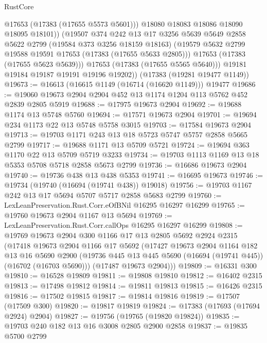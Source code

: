 \begin{lexlean}{RustCore}
\begin{coremodule}
                @17653
                (@17383 (@17655 @5573 @5601)))
              @18080
              @18083
              @18086
              @18090
              @18095
              @18101))
          (@19507
            @374
            @242
            @13
            @17
            @3256
            @5639
            @5649
            @2858
            @5622
            @2799
            (@19584 @373 @3256 @18159 @18163)
            (@19579 @5632 @2799 @19588 @19591 @17653 (@17383 (@17655 @5633 @2805)))
            @17653
            (@17383 (@17655 @5623 @5639)))
          @17653
          (@17383 (@17655 @5565 @5640)))
        @19181
        @19184
        @19187
        @19191
        @19196
        @19202))
    (@17383 (@19281 @19477 @1149))
@19673 := @16613 (@16615 @1149 (@16714 (@16620 @1149))) @19477
@19686 := @19060 @19673 @2904 @2904 @452 @13 @1174 @1204 @113 @5762 @452 @2839 @2805 @5919
@19688 := @17975 @19673 @2904
@19692 := @19688 @1174 @13 @5748 @5760
@19694 := @17571 @19673 @2904
@19701 := @19694 @234 @1173 @22 @13 @5748 @5758 @3015
@19703 := @17584 @19673 @2904
@19713 := @19703 @1171 @243 @13 @18 @5723 @5747 @5757 @2858 @5665 @2799
@19717 := @19688 @1171 @13 @5709 @5721
@19724 := @19694 @363 @1170 @22 @13 @5709 @5719 @3233
@19734 := @19703 @1113 @1169 @13 @18 @5353 @5708 @5718 @2858 @5673 @2799
@19736 := @16686 @19673 @2904
@19740 := @19736 @438 @13 @438 @5353
@19741 := @16695 @19673
@19746 := @19734 (@19740 (@16694 (@19741 @438)) @19018)
@19756 := @19703 @1167 @242 @13 @17 @5694 @5707 @5717 @2858 @5683 @2799
@19760 := LexLeanPreservation.Rust.Corr.eOfBNil @16295 @16297 @16299
@19765 := @19760 @19673 @2904 @1167 @13 @5694
@19769 := LexLeanPreservation.Rust.Corr.callOps @16295 @16297 @16299
@19808 := @19769
    @19673
    @2904
    @300
    @1166
    @17
    @13
    @2805
    @5692
    @2924
    @2315
    (@17418
      @19673
      @2904
      @1166
      @17
      @5692
      (@17427
        @19673
        @2904
        @1164
        @182
        @13
        @16
        @5690
        @2900
        (@19736 @445 @13 @445 @5690 (@16694 (@19741 @445)) (@16702 (@16703 @5690)))
        (@17487 @19673 @2904)))
@19809 := @16331 @300
@19810 := @16528 @19809
@19811 := @19808 @19810
@19812 := @16402 @2315
@19813 := @17498 @19812
@19814 := @19811 @19813
@19815 := @16426 @2315
@19816 := @17502 @19815
@19817 := @19814 @19816
@19819 := @17507 (@17509 @300)
@19820 := @19817 @19819
@19824 := @17383 (@17693 (@17694 @2924) @2904)
@19827 := @19756 (@19765 (@19820 @19824))
@19835 := @19703 @240 @182 @13 @16 @3008 @2805 @2900 @2858
@19837 := @19835 @5700 @2799

\end{coremodule}
\end{lexlean}
